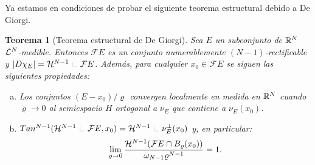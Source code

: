 \documentclass[a4paper,11pt,spanish, twoside, leqno]{tfm-uam}
\newtheorem{teo}{Teorema}[chapter]
\begin{document}
Ya estamos en condiciones de probar el siguiente teorema estructural debido a De Giorgi.
\begin{teo}[Teorema estructural de De Giorgi]\label{teo:teorema estructural de De Giorgi}
Sea $E$ un subconjunto de $\mathbb{R}^{N}$ $\mathcal{L}^{N}$-medible. Entonces $\mathcal{F}E$ es un conjunto numerablemente $(N-1)$-rectificable y $\abs{D\chi_{E}}=\Hm{N-1}\Radot \mathcal{F}E$. Además, para cualquier $x_{0}\in \mathcal{F}E$ se siguen las siguientes propiedades:
\begin{enumerate}[(a)]
\item Los conjuntos $(E-x_{0})/\varrho$ convergen localmente en medida en $\mathbb{R}^{N}$ cuando $\varrho\to 0$ al semiespacio $H$ ortogonal a $\nu_{E}$ que contiene a $\nu_{E}(x_{0})$.\label{teo:teorema estructural de De Giorgi:a}
\item $\Tan{N-1}{\Hm{N-1}\Radot \mathcal{F}E}{x_{0}}=\Hm{N-1}\Radot \nu^{\perp}_{E}(x_{0})$ y, en particular:
\begin{align}\label{teo:teorema estructural de De Giorgi:b:eq:1}
\lim_{\varrho\to 0}\dfrac{\mathcal{H}^{N-1}(\mathcal{F}E\cap B_{\varrho}(x_{0}))}{\omega_{N-1}\varrho^{N-1}}=1.
\end{align}
\label{teo:teorema estructural de De Giorgi:b}
\end{enumerate}
\end{teo}
\end{document}
